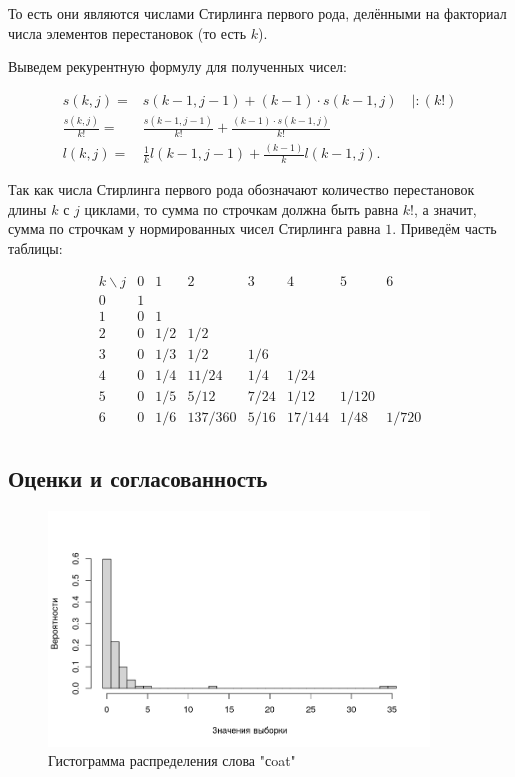 \documentclass[12pt, specialist, subf, substylefile = spbu_report.rtx]{disser}
\begin{document}
	То есть они являются числами Стирлинга первого рода, делёнными на факториал числа элементов перестановок (то есть $ k $).
	
	Выведем рекурентную формулу для полученных чисел:
	
	\[
	\begin{aligned}
		s(k, j) =& s(k - 1, j - 1) + (k - 1) \cdot s(k - 1, j) \quad | : (k!)\\
		\frac {s(k, j)} {k!} =& \frac {s(k - 1, j - 1)} {k !} + \frac {(k - 1) \cdot s(k - 1, j)} {k !}\\
		l(k, j) =& \frac {1} {k} l(k - 1, j - 1) + \frac {(k -1)} {k} l(k - 1, j).
	\end{aligned}
	\]
	
	Так как числа Стирлинга первого рода обозначают количество перестановок длины $k$ с $j$ циклами, то сумма по строчкам должна быть равна $k!$, а значит, сумма по строчкам у нормированных чисел Стирлинга равна $1$. Приведём часть таблицы:
	\begin{center}
		\[
		\begin{array}{c|cccccccc}
			k \backslash j & 0 & 1 & 2 & 3 & 4 & 5 & 6\\ \hline
			0 & 1 &  &  &  &  &  & \\
			1 & 0 & 1 &  &  &  &  & \\
			2 & 0 & 1 / 2 & 1 / 2 &  &  &  & \\
			3 & 0 & 1 / 3 & 1 / 2 & 1 / 6 &  &  & \\
			4 & 0 & 1 / 4 & 11 / 24 & 1 / 4 & 1 / 24 &  & \\
			5 & 0 & 1 / 5 & 5 / 12 & 7 / 24 & 1 / 12 & 1 / 120 & \\
			6 & 0 & 1 / 6 & 137 / 360 & 5 / 16 & 17 / 144 & 1 / 48 & 1 / 720\\
		\end{array}
		\]
	\end{center}
	
	\subsection{Оценки и согласованность}
	
	\begin{figure}[ht]
		\centering
		\includegraphics[width = 0.9\textwidth]{coathist}
		\caption{Гистограмма распределения слова "сoat"}
		\label{img:coathist}
	\end{figure}
\end{document}
